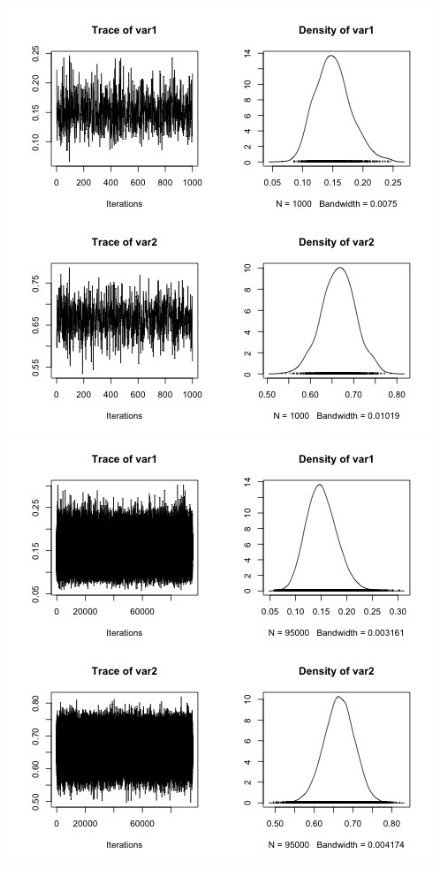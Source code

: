 \documentclass[11pt,a4paper]{article}
\begin{document}
\begin{figure}[h!]
  \includegraphics[scale=0.33]{images/gibbs_100_0.jpg}
  \includegraphics[scale=0.33]{images/gibbs_5000_0.jpg}

\end{figure}
\end{document}
